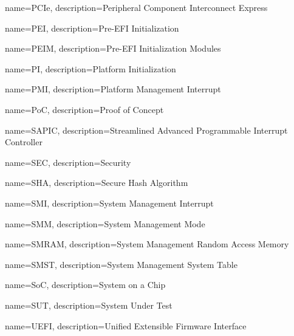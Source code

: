  {
  name=PCIe,
  description={Peripheral Component Interconnect Express
  }
}

 {
    name=PEI,
    description={Pre-EFI Initialization
    }
}

 {
    name=PEIM,
    description={Pre-EFI Initialization Modules
    }
}

 {
  name=PI,
  description={Platform Initialization
  }
}

 {
  name=PMI,
  description={Platform Management Interrupt
  }
}

 {
  name=PoC,
  description={Proof of Concept
  }
}

 {
  name=SAPIC,
  description={Streamlined Advanced Programmable Interrupt Controller
  }
}

 {
  name=SEC,
  description={Security
  }
}

 {
  name=SHA,
  description={Secure Hash Algorithm
  }
}

 {
  name=SMI,
  description={System Management Interrupt
  }
}

 {
  name=SMM,
  description={System Management Mode
  }
}


 {
  name=SMRAM,
  description={System Management Random Access Memory
  }
}


 {
  name=SMST,
  description={System Management System Table
  }
}

 {
  name=SoC,
  description={System on a Chip
  }
}


 {
  name=SUT,
  description={System Under Test
  }
}

 {
  name=UEFI,
  description={Unified Extensible Firmware Interface
  }
}

